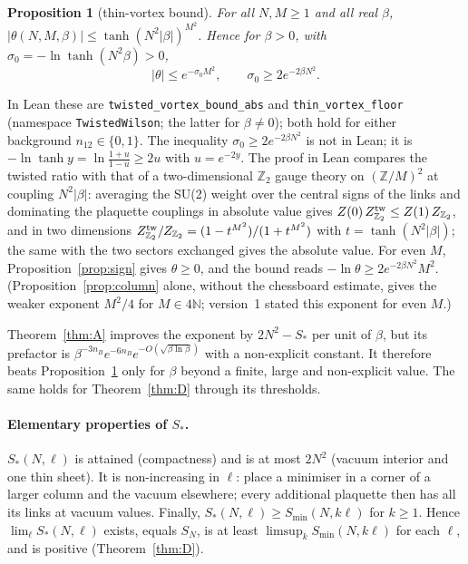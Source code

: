 \documentclass[11pt,a4paper]{article}
\newtheorem{proposition}[lemma]{Proposition}
\theoremstyle{definition}
\theoremstyle{remark}
\newcommand{\code}[1]{\texttt{#1}}
\begin{document}
\begin{proposition}[thin-vortex bound]\label{prop:trivial}
For all $N,M\ge1$ and all real $\beta$, $|\theta(N,M,\beta)|\le\tanh(N^2|\beta|)^{M^2}$. Hence for $\beta>0$, with $\sigma_0=-\ln\tanh(N^2\beta)>0$,
\[ |\theta|\le e^{-\sigma_0M^2},\qquad \sigma_0\ge2e^{-2\beta N^2}. \]
\end{proposition}
In Lean these are \code{twisted\_vortex\_bound\_abs} and \code{thin\_vortex\_floor} (namespace \code{TwistedWilson}; the latter for $\beta\ne0$); both hold for either background $n_{12}\in\{0,1\}$.
The inequality $\sigma_0\ge2e^{-2\beta N^2}$ is not in Lean; it is $-\ln\tanh y=\ln\frac{1+u}{1-u}\ge2u$ with $u=e^{-2y}$.
The proof in Lean compares the twisted ratio with that of a two-dimensional $\mathbb{Z}_2$ gauge theory on $(\mathbb{Z}/M)^2$ at coupling $N^2|\beta|$: averaging the SU(2) weight over the central signs of the links and dominating the plaquette couplings in absolute value gives $Z(0)\,Z_{\mathbb{Z}_2}^{\rm tw}\le Z(1)\,Z_{\mathbb{Z}_2}$, and in two dimensions $Z^{\rm tw}_{\mathbb{Z}_2}/Z_{\mathbb{Z}_2}=(1-t^{M^2})/(1+t^{M^2})$ with $t=\tanh(N^2|\beta|)$; the same with the two sectors exchanged gives the absolute value.
For even $M$, Proposition~\ref{prop:sign} gives $\theta\ge0$, and the bound reads $-\ln\theta\ge2e^{-2\beta N^2}M^2$. (Proposition~\ref{prop:column} alone, without the chessboard estimate, gives the weaker exponent $M^2/4$ for $M\in4\mathbb{N}$; version~1 stated this exponent for even $M$.)

Theorem~\ref{thm:A} improves the exponent by $2N^2-S_*$ per unit of $\beta$, but its prefactor is $\beta^{-3n_B}e^{-6n_B}e^{-O(\sqrt{\beta\ln\beta})}$ with a non-explicit constant.
It therefore beats Proposition~\ref{prop:trivial} only for $\beta$ beyond a finite, large and non-explicit value.
The same holds for Theorem~\ref{thm:D} through its thresholds.

\paragraph{Elementary properties of $S_*$.}
$S_*(N,\ell)$ is attained (compactness) and is at most $2N^2$ (vacuum interior and one thin sheet).
It is non-increasing in $\ell$: place a minimiser in a corner of a larger column and the vacuum elsewhere; every additional plaquette then has all its links at vacuum values.
Finally, $S_*(N,\ell)\ge S_{\min}(N,k\ell)$ for $k\ge1$.
Hence $\lim_\ell S_*(N,\ell)$ exists, equals $S_N$, is at least $\limsup_kS_{\min}(N,k\ell)$ for each $\ell$, and is positive (Theorem~\ref{thm:D}).
\end{document}
